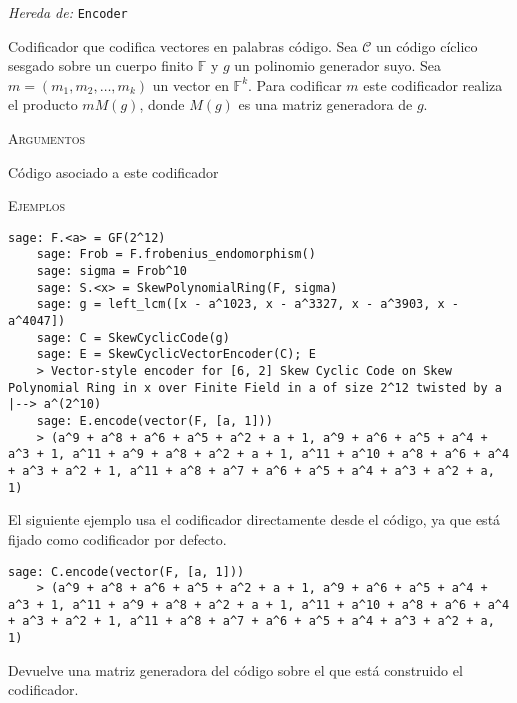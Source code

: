 \begin{description}[leftmargin=1em, font=\normalfont\ttfamily, style=nextline]
  \item[class SkewCyclicVectorEncoder(self, code)]
  
  \emph{Hereda de:} \texttt{Encoder}

  Codificador que codifica vectores en palabras código.
  Sea \(\mathcal C\) un código cíclico sesgado sobre un cuerpo finito \(\mathbb F\) y \(g\) un polinomio generador suyo.
  Sea \(m = (m_1, m_2, \dots, m_k)\) un vector en \(\mathbb F^k\).
  Para codificar \(m\) este codificador realiza el producto \(mM(g)\), donde \(M(g)\) es una matriz generadora de \(g\).  

  \textsc{Argumentos}
  \begin{description}[font=\normalfont\ttfamily]
    \item[code] Código asociado a este codificador
  \end{description}

  \textsc{Ejemplos}
  \begin{lstlisting}[gobble=4]
    sage: F.<a> = GF(2^12)
    sage: Frob = F.frobenius_endomorphism()
    sage: sigma = Frob^10
    sage: S.<x> = SkewPolynomialRing(F, sigma)
    sage: g = left_lcm([x - a^1023, x - a^3327, x - a^3903, x - a^4047])
    sage: C = SkewCyclicCode(g)
    sage: E = SkewCyclicVectorEncoder(C); E
    > Vector-style encoder for [6, 2] Skew Cyclic Code on Skew Polynomial Ring in x over Finite Field in a of size 2^12 twisted by a |--> a^(2^10)
    sage: E.encode(vector(F, [a, 1]))
    > (a^9 + a^8 + a^6 + a^5 + a^2 + a + 1, a^9 + a^6 + a^5 + a^4 + a^3 + 1, a^11 + a^9 + a^8 + a^2 + a + 1, a^11 + a^10 + a^8 + a^6 + a^4 + a^3 + a^2 + 1, a^11 + a^8 + a^7 + a^6 + a^5 + a^4 + a^3 + a^2 + a, 1)
  \end{lstlisting}

  El siguiente ejemplo usa el codificador directamente desde el código, ya que está fijado como codificador por defecto.

  \begin{lstlisting}[gobble=4]
    sage: C.encode(vector(F, [a, 1]))
    > (a^9 + a^8 + a^6 + a^5 + a^2 + a + 1, a^9 + a^6 + a^5 + a^4 + a^3 + 1, a^11 + a^9 + a^8 + a^2 + a + 1, a^11 + a^10 + a^8 + a^6 + a^4 + a^3 + a^2 + 1, a^11 + a^8 + a^7 + a^6 + a^5 + a^4 + a^3 + a^2 + a, 1)
  \end{lstlisting}

  \begin{description}[font=\ttfamily, style=nextline]
    \item[generator\_matrix()] Devuelve una matriz generadora del código sobre el que está construido el codificador.
    

\end{description}
\end{description}
